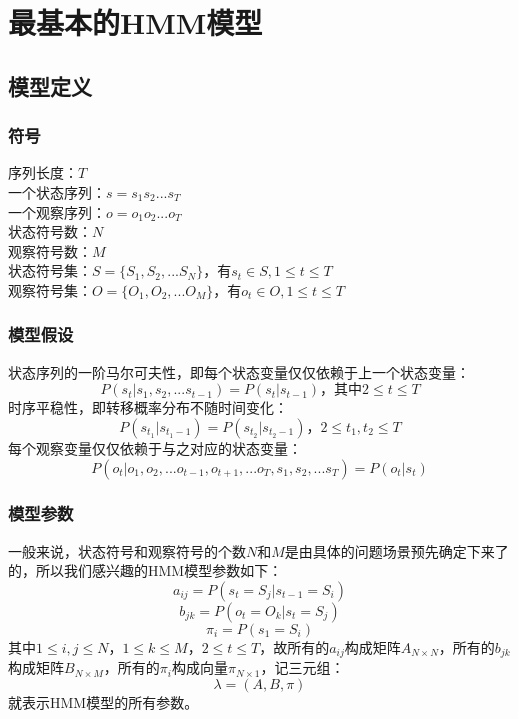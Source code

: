\documentclass[11pt,a4paper]{article}
\begin{document}
 

\section{最基本的HMM模型}
\subsection{模型定义}
\subsubsection{符号}

序列长度：$T$\\
一个状态序列：$s=s_1 s_2 ... s_T$\\
一个观察序列：$o=o_1 o_2 ... o_T$\\
状态符号数：$N$\\
观察符号数：$M$\\
状态符号集：$S=\{S_1, S_2, ... S_N\}$，有$s_t \in S, 1 \le t \le T$\\
观察符号集：$O=\{O_1, O_2, ... O_M\}$，有$o_t \in O, 1 \le t \le T$\\

\subsubsection{模型假设}

状态序列的一阶马尔可夫性，即每个状态变量仅仅依赖于上一个状态变量：
\begin{equation} P(s_t | s_1, s_2, ... s_{t - 1}) = P(s_t | s_{t - 1})\text{，其中$2 \le t \le T$} \end{equation}
时序平稳性，即转移概率分布不随时间变化：
\begin{equation} P(s_{t_1} | s_{t_1 - 1}) = P(s_{t_2} | s_{t_2 - 1})\text{，$2 \le t_1, t_2 \le T$} \end{equation}
每个观察变量仅仅依赖于与之对应的状态变量：
\begin{equation} P(o_t | o_1, o_2, ... o_{t - 1}, o_{t + 1}, ... o_T, s_1, s_2, ... s_T) = P(o_t | s_t) \end{equation}

\subsubsection{模型参数}

一般来说，状态符号和观察符号的个数$N$和$M$是由具体的问题场景预先确定下来了的，所以我们感兴趣的HMM模型参数如下：
$$ a_{ij} = P(s_t = S_j | s_{t - 1} = S_i) $$
$$ b_{jk} = P(o_t = O_k | s_t = S_j) $$
$$ \pi_i = P(s_1 = S_i) $$
其中$1 \le i, j \le N$，$1 \le k \le M$，$2 \le t \le T$，故所有的$a_{ij}$构成矩阵$A_{N \times N}$，所有的$b_{jk}$构成矩阵$B_{N \times M}$，所有的$\pi_i$构成向量$\pi_{N \times 1}$，记三元组：
$$ \lambda = (A, B, \pi) $$
就表示HMM模型的所有参数。
\end{document}
